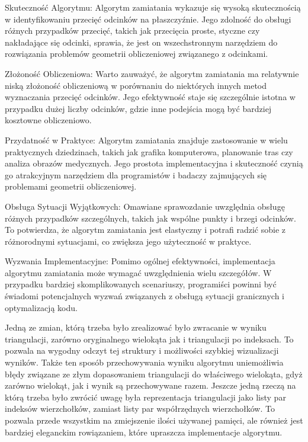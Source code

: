 \quad 
Skuteczność Algorytmu:
Algorytm zamiatania wykazuje się wysoką skutecznością w identyfikowaniu przecięć odcinków na płaszczyźnie. Jego zdolność do obsługi różnych przypadków przecięć, takich jak przecięcia proste, styczne czy nakładające się odcinki, sprawia, że jest on wszechstronnym narzędziem do rozwiązania problemów geometrii obliczeniowej związanego z odcinkami.

Złożoność Obliczeniowa:
Warto zauważyć, że algorytm zamiatania ma relatywnie niską złożoność obliczeniową w porównaniu do niektórych innych metod wyznaczania przecięć odcinków. Jego efektywność staje się szczególnie istotna w przypadku dużej liczby odcinków, gdzie inne podejścia mogą być bardziej kosztowne obliczeniowo.

Przydatność w Praktyce:
Algorytm zamiatania znajduje zastosowanie w wielu praktycznych dziedzinach, takich jak grafika komputerowa, planowanie tras czy analiza obrazów medycznych. Jego prostota implementacyjna i skuteczność czynią go atrakcyjnym narzędziem dla programistów i badaczy zajmujących się problemami geometrii obliczeniowej.

Obsługa Sytuacji Wyjątkowych:
Omawiane sprawozdanie uwzględnia obsługę różnych przypadków szczególnych, takich jak wspólne punkty i brzegi odcinków. To potwierdza, że algorytm zamiatania jest elastyczny i potrafi radzić sobie z różnorodnymi sytuacjami, co zwiększa jego użyteczność w praktyce.

Wyzwania Implementacyjne:
Pomimo ogólnej efektywności, implementacja algorytmu zamiatania może wymagać uwzględnienia wielu szczegółów. W przypadku bardziej skomplikowanych scenariuszy, programiści powinni być świadomi potencjalnych wyzwań związanych z obsługą sytuacji granicznych i optymalizacją kodu.

Jedną ze zmian, którą trzeba było zrealizować było zwracanie w wyniku triangulacji, zarówno oryginalnego 
wielokąta jak i triangulacji po indeksach. To pozwala na wygodny odczyt tej struktury i możliwości szybkiej wizualizacji wyników. Także 
ten sposób przechowywania wyniku algorytmu uniemożliwia błędy związane ze złym dopasowaniem triangulacji do właściwego wielokąta, gdyż zarówno wielokąt, jak i wynik są przechowywane razem. 
Jeszcze jedną rzeczą na którą trzeba było zwrócić uwagę była reprezentacja triangulacji jako listy par indeksów wierzchołków, zamiast listy par współrzędnych wierzchołków. 
To pozwala przede wszystkim na zmiejszenie ilości używanej pamięci, ale również jest bardziej eleganckim rowiązaniem, które upraszcza implementacje algorytmu.